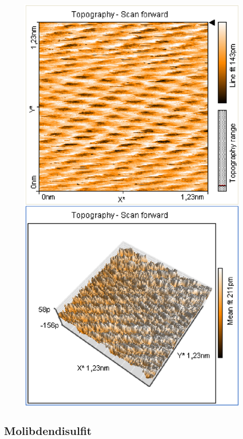 \documentclass[12pt]{article}
\begin{document}
\begin{figure}[H]
\begin{minipage}{0.4\linewidth}
\includegraphics[width=0.9\linewidth]{../plot/data/graphit/graphit5.eps}
\end{minipage}
\end{figure}

\subsection{Molibdendisulfit}
\end{document}
